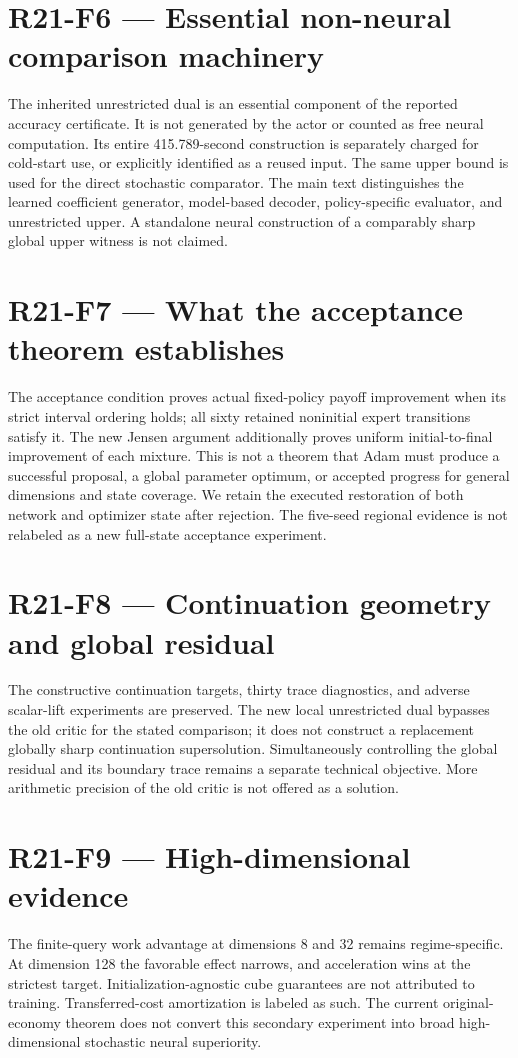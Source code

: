 \documentclass[ecta]{econsocart}
\theoremstyle{remark}
\begin{document}
\section{R21-F6 — Essential non-neural comparison machinery}
The inherited unrestricted dual is an essential component of the reported accuracy certificate. It is not generated by the actor or counted as free neural computation. Its entire 415.789-second construction is separately charged for cold-start use, or explicitly identified as a reused input. The same upper bound is used for the direct stochastic comparator. The main text distinguishes the learned coefficient generator, model-based decoder, policy-specific evaluator, and unrestricted upper. A standalone neural construction of a comparably sharp global upper witness is not claimed.

\section{R21-F7 — What the acceptance theorem establishes}
The acceptance condition proves actual fixed-policy payoff improvement when its strict interval ordering holds; all sixty retained noninitial expert transitions satisfy it. The new Jensen argument additionally proves uniform initial-to-final improvement of each mixture. This is not a theorem that Adam must produce a successful proposal, a global parameter optimum, or accepted progress for general dimensions and state coverage. We retain the executed restoration of both network and optimizer state after rejection. The five-seed regional evidence is not relabeled as a new full-state acceptance experiment.

\section{R21-F8 — Continuation geometry and global residual}
The constructive continuation targets, thirty trace diagnostics, and adverse scalar-lift experiments are preserved. The new local unrestricted dual bypasses the old critic for the stated comparison; it does not construct a replacement globally sharp continuation supersolution. Simultaneously controlling the global residual and its boundary trace remains a separate technical objective. More arithmetic precision of the old critic is not offered as a solution.

\section{R21-F9 — High-dimensional evidence}
The finite-query work advantage at dimensions 8 and 32 remains regime-specific. At dimension 128 the favorable effect narrows, and acceleration wins at the strictest target. Initialization-agnostic cube guarantees are not attributed to training. Transferred-cost amortization is labeled as such. The current original-economy theorem does not convert this secondary experiment into broad high-dimensional stochastic neural superiority.
\end{document}
